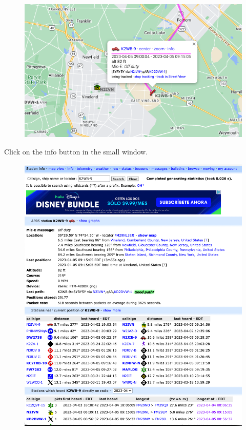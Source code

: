 \documentclass[
  letterpaper,
  DIV=11,
  numbers=noendperiod]{scrreport}
\begin{document}
\begin{figure}

{\centering \includegraphics{include/img/aprs-k2wb-9.png}

}

\end{figure}

Click on the info button in the small window.

\begin{figure}

{\centering \includegraphics{include/img/aprs-k2wb-9-info.png}

}

\end{figure}
\end{document}
